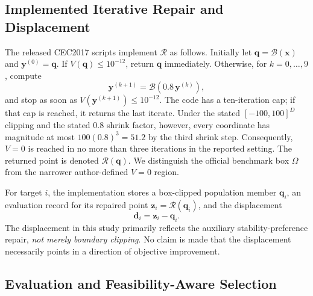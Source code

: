 \documentclass[journal]{IEEEtran}
\begin{document}
\subsection{Implemented Iterative Repair and Displacement}

The released CEC2017 scripts implement $\mathcal{R}$ as follows. Initially let $\mathbf{q}=\mathcal{B}(\mathbf{x})$ and $\mathbf{y}^{(0)}=\mathbf{q}$. If $V(\mathbf{q})\leq10^{-12}$, return $\mathbf{q}$ immediately. Otherwise, for $k=0,\ldots,9$, compute
\begin{equation}
\mathbf{y}^{(k+1)}=\mathcal{B}\!\left(0.8\,\mathbf{y}^{(k)}\right),
\label{eq:shrink}
\end{equation}
and stop as soon as $V(\mathbf{y}^{(k+1)})\leq 10^{-12}$. The code has a ten-iteration cap; if that cap is reached, it returns the last iterate. Under the stated $[-100,100]^D$ clipping and the stated $0.8$ shrink factor, however, every coordinate has magnitude at most $100(0.8)^3=51.2$ by the third shrink step. Consequently, $V=0$ is reached in no more than three iterations in the reported setting. The returned point is denoted $\mathcal{R}(\mathbf{q})$. We distinguish the official benchmark box $\Omega$ from the narrower author-defined $V=0$ region.

For target $i$, the implementation stores a box-clipped population member $\mathbf{q}_i$, an evaluation record for its repaired point $\mathbf{z}_i=\mathcal{R}(\mathbf{q}_i)$, and the displacement
\begin{equation}
\mathbf{d}_i=\mathbf{z}_i-\mathbf{q}_i.
\label{eq:repairdisp}
\end{equation}
The displacement in this study primarily reflects the auxiliary stability-preference repair, \emph{not merely boundary clipping}. No claim is made that the displacement necessarily points in a direction of objective improvement.

\subsection{Evaluation and Feasibility-Aware Selection}
\end{document}
